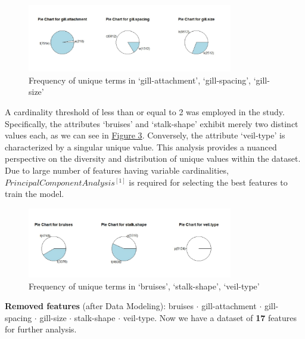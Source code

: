 \documentclass{article}
\begin{document}
\vspace{.25cm}
\begin{figure}[ht]
    \centering
    \includegraphics[width=0.8\textwidth]{./images/Gill.jpg}
    \caption{Frequency of unique terms in `gill-attachment', `gill-spacing', `gill-size'}
    \label{img:2}
\end{figure}

A cardinality threshold of less than or equal to 2 was employed in the study. Specifically, the attributes `bruises' and `stalk-shape' exhibit merely two distinct values each, as we can see in \hyperref[img:3]{Figure 3}. Conversely, the attribute `veil-type' is characterized by a singular unique value. This analysis provides a nuanced perspective on the diversity and distribution of unique values within the dataset. Due to large number of features having variable cardinalities, $Principal Component Analysis^{[\hyperref[subsection:pca]{1}]}$ is required for selecting the best features to train the model.


\begin{figure}[ht]
    \centering
    \includegraphics[width=0.8\textwidth]{./images/bruises_veil-type_stalk-shape.jpg}
    \caption{Frequency of unique terms in `bruises', `stalk-shape', `veil-type'}
    \label{img:3}
\end{figure}

\textbf{Removed features} (after Data Modeling): bruises $\cdot$ gill-attachment $\cdot$ gill-spacing $\cdot$ gill-size $\cdot$ stalk-shape $\cdot$ veil-type. Now we have a dataset of \textbf{17} features for further analysis.
\end{document}
